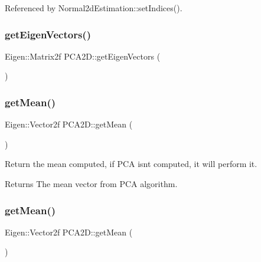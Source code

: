 Referenced by Normal2d\+Estimation\+::set\+Indices().

\mbox{\label{classPCA2D_a2243f1d03a734f7cf4f9f959f494a2e0}} 
\subsubsection{\texorpdfstring{get\+Eigen\+Vectors()}{getEigenVectors()}\hspace{0.1cm}{\footnotesize\ttfamily [2/2]}}
{\footnotesize\ttfamily Eigen\+::\+Matrix2f P\+C\+A2\+D\+::get\+Eigen\+Vectors (\begin{DoxyParamCaption}{ }\end{DoxyParamCaption})\hspace{0.3cm}{\ttfamily [inline]}}

\mbox{\label{classPCA2D_a35ed9e55a614bb7fd87025945867cffa}} 
\subsubsection{\texorpdfstring{get\+Mean()}{getMean()}\hspace{0.1cm}{\footnotesize\ttfamily [1/2]}}
{\footnotesize\ttfamily Eigen\+::\+Vector2f P\+C\+A2\+D\+::get\+Mean (\begin{DoxyParamCaption}{ }\end{DoxyParamCaption})\hspace{0.3cm}{\ttfamily [inline]}}



Return the mean computed, if P\+CA isn\textquotesingle{}t computed, it will perform it. 

\begin{DoxyReturn}{Returns}
The mean vector from P\+CA algorithm. 
\end{DoxyReturn}
\mbox{\label{classPCA2D_a35ed9e55a614bb7fd87025945867cffa}} 
\subsubsection{\texorpdfstring{get\+Mean()}{getMean()}\hspace{0.1cm}{\footnotesize\ttfamily [2/2]}}
{\footnotesize\ttfamily Eigen\+::\+Vector2f P\+C\+A2\+D\+::get\+Mean (\begin{DoxyParamCaption}{ }\end{DoxyParamCaption})\hspace{0.3cm}{\ttfamily [inline]}}

